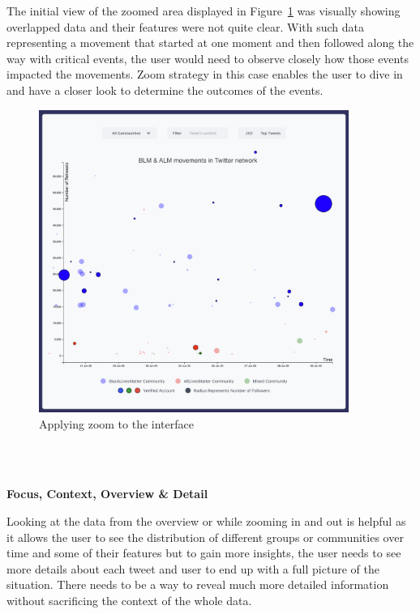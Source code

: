 The initial view of the zoomed area displayed in Figure~\ref{fig:e-zoom} was visually showing overlapped data and their features were not quite clear. With such data representing a movement that started at one moment and then followed along the way with critical events, the user would need to observe closely how those events impacted the movements. Zoom strategy in this case enables the user to dive in and have a closer look to determine the outcomes of the events.

\begin{figure}[H]
\centering
\captionsetup{justification=centering}
\includegraphics[width=0.9\textwidth]{Report-latex/tex_files/pics/example/zoom.png}
\caption{Applying zoom to the interface}
\label{fig:e-zoom}
\end{figure}


\\\

\textbf{Focus, Context, Overview \& Detail}

Looking at the data from the overview or while zooming in and out is helpful as it allows the user to see the distribution of different groups or communities over time and some of their features but to gain more insights, the user needs to see more details about each tweet and user to end up with a full picture of the situation. There needs to be a way to reveal much more detailed information without sacrificing the context of the whole data. 

\\\

